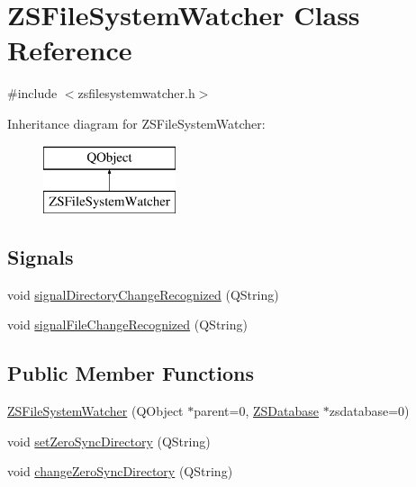 \hypertarget{class_z_s_file_system_watcher}{\section{Z\-S\-File\-System\-Watcher Class Reference}
\label{class_z_s_file_system_watcher}
}


{\ttfamily \#include $<$zsfilesystemwatcher.\-h$>$}

Inheritance diagram for Z\-S\-File\-System\-Watcher\-:\begin{figure}[H]
\begin{center}
\leavevmode
\includegraphics[height=2.000000cm]{class_z_s_file_system_watcher}
\end{center}
\end{figure}
\subsection*{Signals}
\begin{DoxyCompactItemize}
\item 
void \hyperlink{class_z_s_file_system_watcher_a480eedeb0d335cf692c002b710c3c94b}{signal\-Directory\-Change\-Recognized} (Q\-String)
\item 
void \hyperlink{class_z_s_file_system_watcher_a118b7f9b6356b07729ad2167921da4fd}{signal\-File\-Change\-Recognized} (Q\-String)
\end{DoxyCompactItemize}
\subsection*{Public Member Functions}
\begin{DoxyCompactItemize}
\item 
\hyperlink{class_z_s_file_system_watcher_a1d28ccc55263ad5af3155bad1048bf7d}{Z\-S\-File\-System\-Watcher} (Q\-Object $\ast$parent=0, \hyperlink{class_z_s_database}{Z\-S\-Database} $\ast$zsdatabase=0)
\item 
void \hyperlink{class_z_s_file_system_watcher_a99a18ceeab7e24dc79a7cd00003691c6}{set\-Zero\-Sync\-Directory} (Q\-String)
\item 
void \hyperlink{class_z_s_file_system_watcher_a4d4de58c5b1d09da7b15f7f25a82c60b}{change\-Zero\-Sync\-Directory} (Q\-String)
\end{DoxyCompactItemize}


